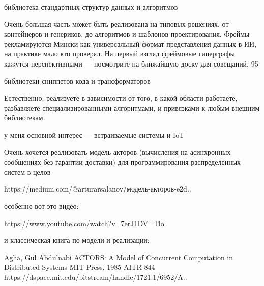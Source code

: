 \clearpage

\subsecly{}библиотека стандартных структур данных и алгоритмов

Очень большая часть может быть реализована на типовых решениях, от контейнеров и генериков, до алгоритмов и шаблонов проектирования. Фреймы рекламируются Мински как универсальный формат представления данных в ИИ, на практике мало кто проверял. На первый взгляд фреймовые гиперграфы кажутся перспективными — посмотрите на ближайшую доску для совещаний, 95%

\subsecly{}библиотеки сниппетов кода и трансформаторов

Естественно, реализуете в зависимости от того, в какой области работаете, разбавляете специализированными алгоритмами, и привязками к любым внешним библиотекам.

\clearpage

у меня основной интерес — встраиваемые системы и IoT

Очень хочется реализовать модель акторов (вычисления на асинхронных сообщениях без гарантии доставки) для программирования распределенных систем в целов

https://medium.com/@arturarsalanov/модель-акторов-e2d..

особенно вот это видео:

https://www.youtube.com/watch?v=7erJ1DV_Tlo

и классическая книга по модели и реализации:

\cite{agha}
Agha, Gul Abdulnabi
ACTORS: A Model of Concurrent Computation in Distributed Systems
MIT Press, 1985
AITR-844 https://dspace.mit.edu/bitstream/handle/1721.1/6952/A..

